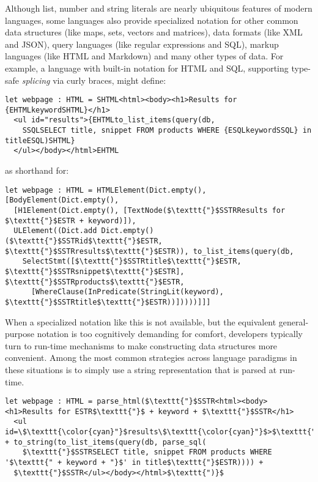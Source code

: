 Although list, number and string literals are nearly ubiquitous features of modern languages, some languages also  provide specialized notation for other common data structures (like maps, sets, vectors and matrices), data formats (like XML and JSON), query languages (like regular expressions and SQL), markup languages (like HTML and Markdown) and many other types of data. For example, a language with built-in notation for HTML and SQL, supporting type-safe \emph{splicing} via curly braces, might define:
\begin{lstlisting}
let webpage : HTML = SHTML<html><body><h1>Results for {EHTMLkeywordSHTML}</h1>
  <ul id="results">{EHTMLto_list_items(query(db, 
    SSQLSELECT title, snippet FROM products WHERE {ESQLkeywordSSQL} in titleESQL)SHTML}
  </ul></body></html>EHTML
\end{lstlisting}
as shorthand for:
\begin{lstlisting}
let webpage : HTML = HTMLElement(Dict.empty(), [BodyElement(Dict.empty(),
  [H1Element(Dict.empty(), [TextNode($\texttt{"}$SSTRResults for $\texttt{"}$ESTR + keyword)]), 
  ULElement((Dict.add Dict.empty() ($\texttt{"}$SSTRid$\texttt{"}$ESTR, $\texttt{"}$SSTRresults$\texttt{"}$ESTR)), to_list_items(query(db, 
    SelectStmt([$\texttt{"}$SSTRtitle$\texttt{"}$ESTR, $\texttt{"}$SSTRsnippet$\texttt{"}$ESTR], $\texttt{"}$SSTRproducts$\texttt{"}$ESTR, 
      [WhereClause(InPredicate(StringLit(keyword), $\texttt{"}$SSTRtitle$\texttt{"}$ESTR))]))))]]]
\end{lstlisting}

When a specialized notation like this is not available, but the equivalent general-purpose notation is too cognitively demanding for comfort, developers typically turn to run-time mechanisms to make constructing data structures more convenient. Among the most common strategies across language paradigms in these situations is to simply use a string representation that is parsed at run-time.%
\begin{lstlisting}
let webpage : HTML = parse_html($\texttt{"}$SSTR<html><body><h1>Results for ESTR$\texttt{"}$ + keyword + $\texttt{"}$SSTR</h1>
  <ul id=\$\texttt{\color{cyan}"}$results\$\texttt{\color{cyan}"}$>$\texttt{"}$ESTR + to_string(to_list_items(query(db, parse_sql(
  	$\texttt{"}$SSTRSELECT title, snippet FROM products WHERE '$\texttt{" + keyword + "}$' in title$\texttt{"}$ESTR)))) + 
  $\texttt{"}$SSTR</ul></body></html>$\texttt{")}$
\end{lstlisting}

